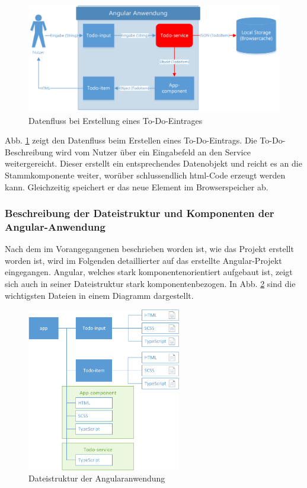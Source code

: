 \begin{figure}[h!]
	\includegraphics[width=\textwidth]{img/pwa_datenfluss_erstellen.png}
	\centering
	\caption{Datenfluss bei Erstellung eines To-Do-Eintrages}
	\label{fig:pwa_datenfluss_erstellen}
\end{figure}

Abb. \ref{fig:pwa_datenfluss_erstellen} zeigt den Datenfluss beim Erstellen eines To-Do-Eintrags. Die To-Do-Beschreibung wird vom Nutzer über ein Eingabefeld an den Service weitergereicht. Dieser erstellt ein entsprechendes Datenobjekt und reicht es an die Stammkomponente weiter, worüber schlussendlich \ac{html}-Code erzeugt werden kann. Gleichzeitig speichert er das neue Element im Browserspeicher ab.

\subsubsection{Beschreibung der Dateistruktur und Komponenten der Angular-Anwendung}
Nach dem im Vorangegangenen beschrieben worden ist, wie das Projekt erstellt worden ist, wird im Folgenden detaillierter auf das erstellte Angular-Projekt eingegangen. Angular, welches stark komponentenorientiert aufgebaut ist, zeigt sich auch in seiner Dateistruktur stark komponentenbezogen. In Abb. \ref{fig:pwa_dateistruktur} sind die wichtigsten Dateien in einem Diagramm dargestellt.

\begin{figure}[h!]
	\includegraphics[width=0.6\textwidth]{img/pwa_dateistruktur.png}
	\centering
	\caption{Dateistruktur der Angularanwendung}
	\label{fig:pwa_dateistruktur}
\end{figure}

